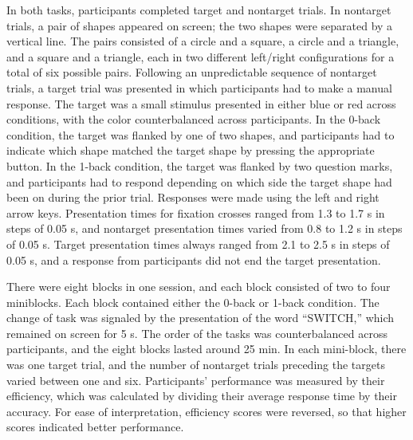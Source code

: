 In both tasks, participants completed target and nontarget trials. In nontarget trials, a pair of shapes appeared on screen; the two shapes were separated by a vertical line. The pairs consisted of a circle and a square, a circle and a triangle, and a square and a triangle, each in two different left/right configurations for a total of six possible pairs. Following an unpredictable sequence of nontarget trials, a target trial was presented in which participants had to make a manual response. The target was a small stimulus presented in either blue or red across conditions, with the color counterbalanced across participants. In the 0-back condition, the target was flanked by one of two shapes, and participants had to indicate which shape matched the target shape by pressing the appropriate button. In the 1-back condition, the target was flanked by two question marks, and participants had to respond depending on which side the target shape had been on during the prior trial. Responses were made using the left and right arrow keys. Presentation times for fixation crosses ranged from 1.3 to 1.7 s in steps of 0.05 s, and nontarget presentation times varied from 0.8 to 1.2 s in steps of 0.05 s. Target presentation times always ranged from 2.1 to 2.5 s in steps of 0.05 s, and a response from participants did not end the target presentation.

There were eight blocks in one session, and each block consisted of two to four miniblocks. Each block contained either the 0-back or 1-back condition. The change of task was signaled by the presentation of the word “SWITCH,” which remained on screen for 5 s. The order of the tasks was counterbalanced across participants, and the eight blocks lasted around 25 min. In each mini-block, there was one target trial, and the number of nontarget trials preceding the targets varied between one and six. Participants’ performance was measured by their efficiency, which was calculated by dividing their average response time by their accuracy. For ease of interpretation, efficiency scores were reversed, so that higher scores indicated better performance.

